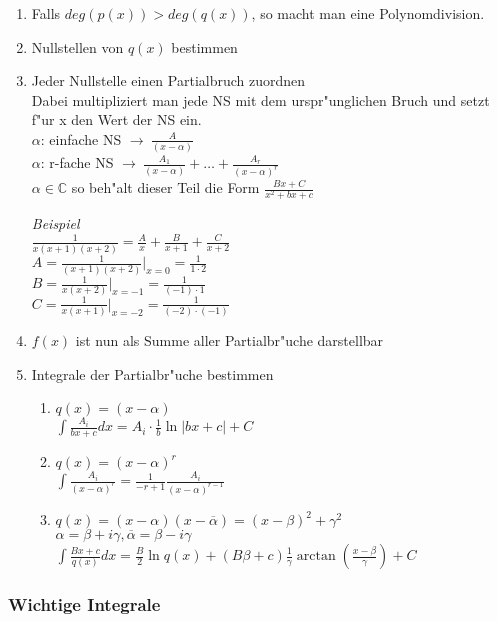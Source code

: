 \documentclass[10pt, a4paper, twocolumn]{scrartcl}
\begin{document}
\begin{enumerate}
 \item Falls $deg(p(x))> deg(q(x))$, so macht man eine Polynomdivision.
 \item Nullstellen von $q(x)$ bestimmen
 \item Jeder Nullstelle einen Partialbruch zuordnen\\
  Dabei multipliziert man jede NS mit dem urspr"unglichen Bruch und setzt f"ur x den Wert der NS ein.\\
  
  $\alpha$: einfache NS $\rightarrow\:\frac{A}{(x-\alpha)}$\\
  $\alpha$: r-fache NS $\rightarrow\:\frac{A_1}{(x-\alpha)}+\ldots+\frac{A_r}{(x-\alpha)^r}$\\
  $\alpha\in\mathbb{C}$ so beh"alt dieser Teil die Form $\frac{Bx+C}{x^2+bx+c}$
  
  \textit{Beispiel}\\
  $\frac{1}{x(x+1)(x+2)}=\frac{A}{x}+\frac{B}{x+1}+\frac{C}{x+2}$\\
  $A=\frac{1}{(x+1)(x+2)}|_{x=0}=\frac{1}{1\cdotp2}$\\
  $B=\frac{1}{x(x+2)}|_{x=-1}=\frac{1}{(-1)\cdotp1}$\\
  $C=\frac{1}{x(x+1)}|_{x=-2}=\frac{1}{(-2)\cdotp(-1)}$
 \item $f(x)$ ist nun als Summe aller Partialbr"uche darstellbar
 \item Integrale der Partialbr"uche bestimmen
  \begin{enumerate}
   \item $q(x)=(x-\alpha)$\\
    $\int\frac{A_i}{bx+c}dx=A_i\cdotp\frac{1}{b}\ln|bx+c|+C$
   \item $q(x)=(x-\alpha)^r$\\
    $\int\frac{A_i}{(x-\alpha)^r}=\frac{1}{-r+1}\frac{A_i}{(x-\alpha)^{r-1}}$
   \item $q(x)=(x-\alpha)(x-\overline{\alpha})=(x-\beta)^2+\gamma^2$\\
    $\alpha=\beta+i\gamma,\overline{\alpha}=\beta-i\gamma$\\
    $\int\frac{Bx+c}{q(x)}dx=\frac{B}{2}\ln q(x) +(B\beta +c)\frac{1}{\gamma}\arctan (\frac{x-\beta}{\gamma})+C$
  \end{enumerate}
\end{enumerate}


\subsubsection{Wichtige Integrale}
\end{document}
